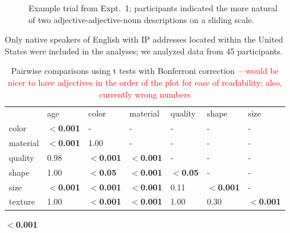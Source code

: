 \documentclass{pnastwo}
\newcommand{\red}[1]{\textcolor{Red}{#1}}
\begin{document}
\begin{article}
\begin{materials}
\begin{figure}[h!]
	\centering
	\caption{Example trial from Expt.\ 1; participants indicated the more natural of two adjective-adjective-noun descriptions on a sliding scale.}\label{order-trial}
\end{figure}

Only native speakers of English with IP addresses located within the United States were included in the analyses; we analyzed data from 45 participants.



\begin{table}
	
\begin{tabular}{lllllll}
	   &    age & color & material & quality & shape & size  \\ 
color &		\textbf{$<$0.001} & -       & -        & - & - & - \\      
material &	\textbf{$<$0.001} & 1.00 & -        & - & - & - \\      
quality & 	0.98 & \textbf{$<$0.001} & \textbf{$<$0.001}  & - & - & - \\      
shape & 	1.00 & \textbf{$<$0.05} & \textbf{$<$0.001}  & \textbf{$<$0.05} & - & - \\     
size & 		\textbf{$<$0.001} & \textbf{$<$0.001} & \textbf{$<$0.001}  & 0.11 & \textbf{$<$0.001} & - \\     
texture & 	1.00 & \textbf{$<$0.001} & \textbf{$<$0.001}  & 1.00 & 0.30 & \textbf{$<$0.001}
\end{tabular}
\caption{Pairwise comparisons using t tests with Bonferroni correction \red{---would be nicer to have adjectives in the order of the plot for ease of readability; also, currently wrong numbers}}
\end{table}

\textbf{$<$0.001}




\end{materials}
\end{article}
\end{document}
